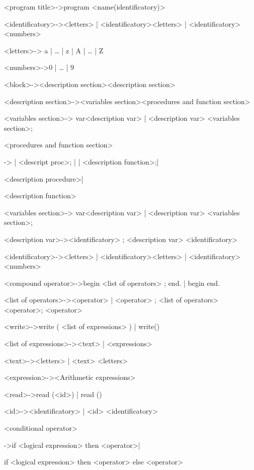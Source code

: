 \documentclass[12pt]{article}
\begin{document}
<program title>->program <name(identificatory)> 

<identificatory>-><letters>  | <identificatory><letters> | <identificatory><numbers>

<letters>-> a | … | z  | A | … | Z

<numbers>->0 | … | 9

<block>-><description section><description section>

<description section>-><variables section><procedures and function section>

<variables section>-> var<description var>  | <description var> <variables section>;

<procedures and function section>

\qquad\qquad\qquad\qquad\qquad\qquad\qquad               ->    | <descript proc>;  |  | <description function>;| 

\qquad\qquad\qquad\qquad\qquad\qquad{} <description procedure>| 

\qquad\qquad\qquad\qquad\qquad\qquad{} <description function>            

<variables section>-> var<description var>  | <description var>   <variables section>;

<description var>-><identificatory> ; <description var>  <identificatory>

<identificatory>-><letters>  | <identificatory><letters> | <identificatory><numbers>

<compound operator>->begin <list of operators> ; end. | begin end.

<list of operators>-><operator>  | <operator> ; <list of operators>  <operator>;
<operator>

<write>->write ( <list of expressions> )  | write()

<list of expressions>-><text> | <expressions>

<text>-><letters>  | <text>   <letters>

<expression>-><Arithmetic expressions>

<read>->read (<id>)  | read ()

<id>-><identificatory> | <id> <identificatory>

<conditional operator> 

\qquad\qquad\qquad\qquad\qquad ->if <logical expression> then <operator>|

\qquad\qquad\qquad\qquad\qquad if <logical expression> then <operator> else <operator>
\end{document}
